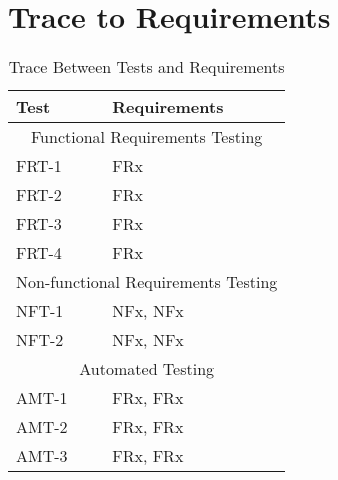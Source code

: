 \documentclass[12pt, titlepage]{article}
\begin{document}
\section{Trace to Requirements}
		\begin{table}[!htbp]
			\begin{tabular}{ll}
				\toprule
				Test & Requirements \\
				\midrule
				\multicolumn{2}{c}{Functional Requirements Testing} \\
				\midrule
				FRT-1 & FRx \\
				FRT-2 & FRx \\
				FRT-3 & FRx \\
				FRT-4 & FRx \\
				\midrule
				\multicolumn{2}{c}{Non-functional Requirements Testing} \\
				\midrule
				NFT-1 & NFx, NFx \\
				NFT-2 & NFx, NFx \\

				\midrule
				\multicolumn{2}{c}{Automated Testing} \\
				\midrule
				AMT-1 & FRx, FRx\\
				AMT-2 & FRx, FRx\\
				AMT-3 & FRx, FRx\\

				\bottomrule
			\end{tabular}
			\caption{Trace Between Tests and Requirements}
			\makeatletter
			\def\rulecolor#1#{\CT@arc{#1}}
			\def\CT@arc#1#2{%
				\ifdim\baselineskip=\z@\noalign\fi
				{\gdef\CT@arc@{\color#1{#2}}}}
			\let\CT@arc@\relax
			\makeatother
			\label{Table}
		\end{table}
		
		\FloatBarrier
	
	\newpage

		
\end{document}
